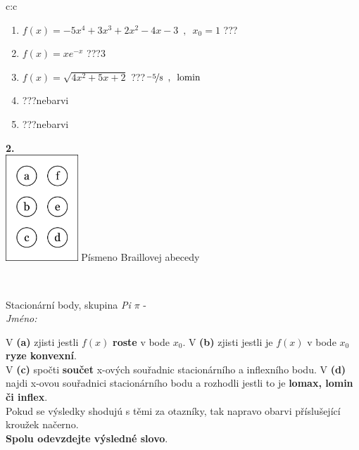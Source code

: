 \documentclass[10pt]{report}
\begin{document}
\begin{tabular}{c:c}
\begin{minipage}[c][104.5mm][t]{0.5\linewidth}
\begin{center}
\begin{minipage}{0.79\linewidth}
\begin{center}
\begin{varwidth}{\linewidth}
\begin{enumerate}
\item $f(x)=-5x^4+3x^3+2x^2-4x-3\enspace , \enspace x_0=1$\quad \dotfill\; ???\;\dotfill \quad {}
\item $f(x)=xe^{-x}$\quad \dotfill\; ???\;\dotfill \quad $3$
\item $f(x)=\sqrt{4x^2+5x+2}$\quad \dotfill\; ???\;\dotfill \quad $\nicefrac{-5}{8}\enspace , \enspace \mathrm{lomin}$
\item \quad \dotfill\; ???\;\dotfill \quad nebarvi
\item \quad \dotfill\; ???\;\dotfill \quad nebarvi
\end{enumerate}
\end{varwidth}
\end{center}
\end{minipage}
\begin{minipage}{0.20\linewidth}
\begin{center}
{\Huge\bfseries 2.} \\[2mm]
\includegraphics[height=40mm]{../images/braille.png}
{\small Písmeno Braillovej abecedy}
\end{center}
\end{minipage}
\end{center}
\end{minipage}
\\ \hdashline
\begin{minipage}[c][104.5mm][t]{0.5\linewidth}
\begin{center}
\vspace{7mm}
{\huge Stacionární body, skupina \textit{Pi $\pi$} -}\\[5mm]
\textit{Jméno:}\phantom{xxxxxxxxxxxxxxxxxxxxxxxxxxxxxxxxxxxxxxxxxxxxxxxxxxxxxxxxxxxxxxxxx}\\[5mm]
\begin{minipage}{0.95\linewidth}
\begin{center}
{\small V \textbf{(a)} zjisti jestli $f(x)$ \textbf{roste} v bode $x_0$. V \textbf{(b)} zjisti jestli je $f(x)$ v bode $x_0$ \textbf{ryze konvexní}.\\V \textbf{(c)} spočti \textbf{součet} x-ových souřadnic stacionárního a inflexního bodu. V \textbf{(d)} najdi x-ovou souřadnici stacionárního bodu a rozhodli jestli to je \textbf{lomax, lomin či inflex}.\\Pokud se výsledky shodujú s těmi za otazníky, tak napravo obarvi příslušející kroužek načerno.\\\textbf{Spolu odevzdejte výsledné slovo}}.

\end{center}
\end{minipage}
\end{center}
\end{minipage}
\end{tabular}
\end{document}
